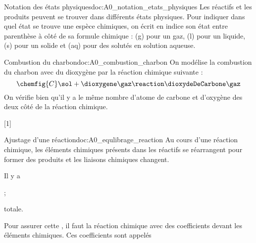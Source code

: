 \begin{doc}{Notation des états physiques}{doc:A0_notation_etats_physiques}
  Les réactifs et les produits peuvent se trouver dans différents états physiques.
  Pour indiquer dans quel état se trouve une espèce chimiques, on écrit en indice son état entre parenthèse à côté de sa formule chimique : (g) pour un gaz, (l) pour un liquide, (s) pour un solide et (aq) pour des solutés en solution aqueuse.
\end{doc}


\begin{doc}{Combustion du charbon}{doc:A0_combustion_charbon}
  On modélise la combustion du charbon avec du dioxygène par la réaction chimique suivante :
  \begin{equation*}
    \chemfig{C}\sol + \dioxygene\gaz \reaction \dioxydeDeCarbone\gaz
  \end{equation*}
  On vérifie bien qu'il y a le même nombre d'atome de carbone et d'oxygène des deux côté de la réaction chimique.
\end{doc}


[1]


\begin{doc}{Ajustage d'une réaction}{doc:A0_equlibrage_reaction}
  Au cours d'une réaction chimique, les éléments chimiques présents dans les réactifs se réarrangent pour former des produits et les liaisons chimiques changent.
  \begin{importants}
    Il y a  
    \begin{listePoints}
      \item {} ;
      \item {} totale.
    \end{listePoints}
  \end{importants}
  \begin{importants}
    Pour assurer cette , il faut  la réaction chimique avec des coefficients devant les éléments chimiques.
    Ces coefficients sont appelés 
  \end{importants}
\end{doc}

